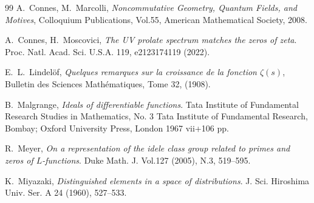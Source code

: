 \documentclass{pspum-l}
\theoremstyle{definition}
\theoremstyle{remark}
\numberwithin{equation}{section}
\begin{document}
\begin{thebibliography}{99}
 A.~Connes, M.~Marcolli,  {\em  Noncommutative Geometry, Quantum Fields, and Motives},
Colloquium Publications, Vol.55, American Mathematical Society, 2008.

 A.~Connes, H.~Moscovici, {\em The UV prolate spectrum matches the zeros of zeta}. Proc. Natl. Acad. Sci. U.S.A. 119, e2123174119 (2022).


 E.~L.~Lindel\" of, {\em Quelques remarques sur la croissance de la fonction $\zeta(s)$}, Bulletin des Sciences Math\' ematiques, Tome 32, (1908).




 B.~Malgrange, {\em  Ideals of differentiable functions}. Tata Institute of Fundamental Research Studies in Mathematics, No. 3 Tata Institute of Fundamental Research, Bombay; Oxford University Press, London 1967 vii+106 pp.

 R.~Meyer, {\em On a representation of the idele class group
related to primes and zeros of $L$-functions}.  Duke Math. J.
Vol.127 (2005),  N.3, 519--595.

 K.~Miyazaki, {\em Distinguished elements in a space of distributions}. J. Sci. Hiroshima Univ. Ser. A 24 (1960), 527--533.
\end{thebibliography}
\end{document}
